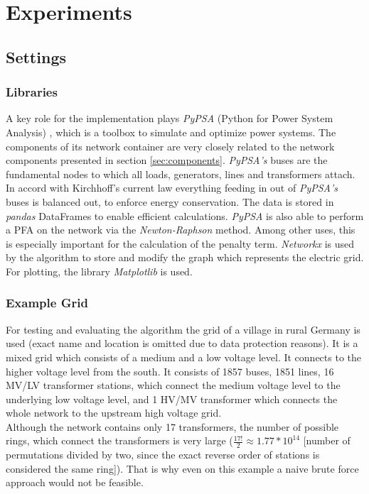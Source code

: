 \chapter{Experiments}\label{chap:experiments}

\section{Settings}
\subsection{Libraries}\label{pypsa}
A key role for the implementation plays \textit{PyPSA} (Python for Power System Analysis) \cite{brown2017pypsa}, which is a toolbox to simulate and optimize power systems. The components of its network container are very closely related to the network components presented in section \ref{sec:components}. \textit{PyPSA's} buses are the fundamental nodes to which all loads, generators, lines and transformers attach. In accord with Kirchhoff's current law everything feeding in out of \textit{PyPSA's} buses is balanced out, to enforce energy conservation. The data is stored in \textit{pandas} DataFrames to enable efficient calculations. \textit{PyPSA} is also able to perform a PFA on the network via the \textit{Newton-Raphson} method. Among other uses, this is especially important for the calculation of the penalty term. \textit{Networkx} is used by the algorithm to store and modify the graph which represents the electric grid. For plotting, the library \textit{Matplotlib} is used.

\subsection{Example Grid}\label{sec:example_grid}
For testing and evaluating the algorithm the grid of a village in rural Germany is used (exact name and location is omitted due to data protection reasons). It is a mixed grid which consists of a medium and a low voltage level. It connects to the higher voltage level from the south. It consists of 1857 buses, 1851 lines, 16 MV/LV transformer stations, which connect the medium voltage level to the underlying low voltage level, and 1 HV/MV transformer which connects the whole network to the upstream high voltage grid. \\
Although the network contains only 17 transformers, the number of possible rings, which connect the transformers is very large ($\frac{17!}{2} \approx 1.77*10^{14}$ [number of permutations divided by two, since the exact reverse order of stations is considered the same ring]). That is why even on this example a naive brute force approach would not be feasible.\\

